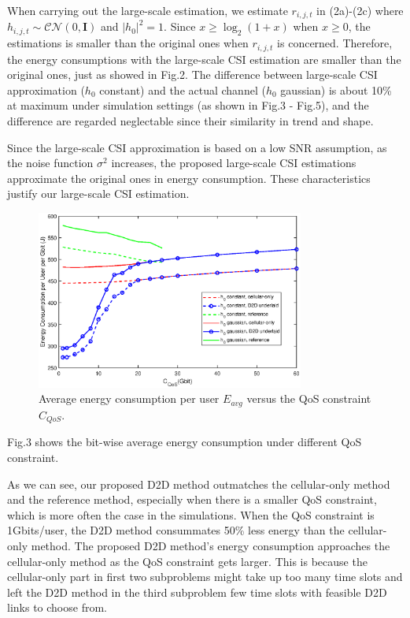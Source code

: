 \documentclass{ieeeaccess}
\begin{document}
When carrying out the large-scale estimation, we estimate ${r_{i,j,t}}$ in (2a)-(2c) where  ${h_{i,j,t}} \sim \mathcal{CN}(0, \mathbf{I})$ and ${\left| {{h_0}} \right|^2} = 1$. Since $x \ge {\log _2}\left( {1 + x} \right)$ when ${x \ge 0}$, the estimations is smaller than the original ones when ${r_{i,j,t}}$ is concerned. Therefore, the energy consumptions with the large-scale CSI estimation are smaller than the original ones, just as showed in Fig.2. The difference between large-scale CSI approximation (${h_0}$ constant) and the actual channel (${h_0}$ gaussian) is about 10\% at maximum under simulation settings (as shown in Fig.3 - Fig.5), and the difference are regarded neglectable since their similarity in trend and shape. 

Since the large-scale CSI approximation is based on a low SNR assumption, as the noise function ${\sigma ^2}$ increases, the proposed large-scale CSI estimations approximate the original ones in energy consumption. These characteristics justify our large-scale CSI estimation.


\begin{figure} [htb]
\includegraphics*[width=8.8cm]{Cqos.eps}
\caption{Average energy consumption per user $E_{avg}$ versus the QoS constraint ${C_{QoS}}$.}\label{fig:3}
\end{figure}




Fig.3 shows the bit-wise average energy consumption under different QoS constraint.

As we can see, our proposed D2D method outmatches the cellular-only method and the reference method, especially when there is a smaller QoS constraint, which is more often the case in the simulations. When the QoS constraint is 1Gbits/user, the D2D method consummates 50\% less energy than the cellular-only method. The proposed D2D method's energy consumption approaches the cellular-only method as the QoS constraint gets larger. This is because the cellular-only part in first two subproblems might take up too many time slots and left the D2D method in the third subproblem few time slots with feasible D2D links to choose from.
\end{document}
